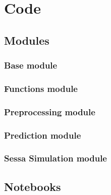 

\chapter{Code} %

\label{AppendixA} %

\section{Modules}

\subsection{Base module}
\label{code:base}


\subsection{Functions module}
\label{code:functions}


\subsection{Preprocessing module}
\label{preprocessing}


\subsection{Prediction module}
\label{code:base}


\subsection{Sessa Simulation module}
\label{Sessa_Module}




\section{Notebooks}

